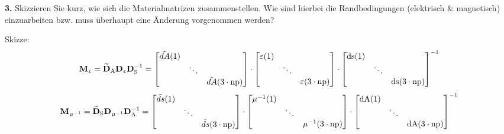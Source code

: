 \documentclass[Protokollheft.tex]{subfiles}
\begin{document}
\begin{framed}
	\noindent \textbf{3.} Skizzieren Sie kurz, wie sich die Materialmatrizen zusammenstellen. Wie sind hierbei die Randbedingungen (elektrisch \& magnetisch) einzuarbeiten bzw. muss überhaupt eine Änderung vorgenommen werden?\label{exer:materialMats}
\end{framed}
\noindent
Skizze:\\
$$\mathbf{M}_{\upvarepsilon} =\mathbf{\widetilde{D}}_\text{A}\mathbf{D}_{\upvarepsilon}\mathbf{D}_\text{S}^{-1} = \begin{bmatrix}
\tilde{dA}(1) & & \\
& \ddots & \\
& & \tilde{dA}(3\cdot\mathrm{np})
\end{bmatrix}
\cdot
 \begin{bmatrix}
\varepsilon(1) & & \\
& \ddots & \\
& & \varepsilon(3\cdot\mathrm{np})
\end{bmatrix}
\cdot
\begin{bmatrix}
\mathrm{ds}(1) & & \\
& \ddots & \\
& & \mathrm{ds}(3\cdot\mathrm{np})
\end{bmatrix}^{-1}$$
$$\mathbf{M}_{\upmu^{-1}}=\mathbf{\widetilde{D}}_\text{S}\mathbf{D}_{\upmu^{-1}}\mathbf{D}_\text{A}^{-1}=
\begin{bmatrix}
\tilde{ds}(1) & & \\
& \ddots & \\
& & \tilde{ds}(3\cdot\mathrm{np})
\end{bmatrix}
\cdot
 \begin{bmatrix}
\mu^{-1}(1) & & \\
& \ddots & \\
& & \mu^{-1}(3\cdot\mathrm{np})
\end{bmatrix}
\cdot
\begin{bmatrix}
\mathrm{dA}(1) & & \\
& \ddots & \\
& & \mathrm{dA}(3\cdot\mathrm{np})
\end{bmatrix}^{-1}$$
\noindent
\end{document}
